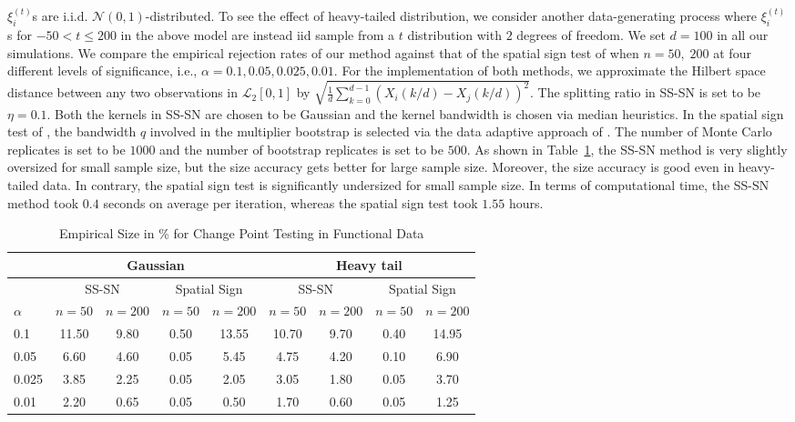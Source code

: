 \documentclass[11pt]{article}
\theoremstyle{plain}
\theoremstyle{definition}
\theoremstyle{remark}
\begin{document}
$\xi_i^{(t)}$s are i.i.d. $\mathcal{N}(0,1)$-distributed. To see the effect of heavy-tailed distribution, we consider another data-generating process where $\xi_i^{(t)}$s for $-50<t\leq 200$ in the above model are instead iid sample from a $t$ distribution with $2$ degrees of freedom. We set $d=100$ in all our simulations.  We compare the empirical rejection rates of our method against that of the spatial sign test of \cite{wegner2024robust} when $n=50,\; 200$ at four different levels of significance, i.e., $\alpha=0.1, 0.05, 0.025, 0.01$. For the implementation of both methods, we approximate the Hilbert space distance between any two observations in $\mathcal{L}_2[0,1]$ by $\sqrt{\frac{1}{d}\sum_{k=0}^{d-1} (X_i(k/d)-X_j(k/d))^2}.$ The splitting ratio in SS-SN is set to be $\eta=0.1$. Both the kernels in SS-SN are chosen to be Gaussian and the kernel bandwidth is chosen via median heuristics. In the spatial sign test of \cite{wegner2024robust}, the bandwidth $q$ involved in the multiplier bootstrap is selected via the data adaptive approach of \cite{rice2017plug}. The number of Monte Carlo replicates is set to be $1000$ and the number of bootstrap replicates is set to be $500$. As shown in Table~\ref{tab:Size_CPD_FDA}, the SS-SN method is very slightly oversized for small sample size, but the size accuracy gets better for large sample size. Moreover, the size accuracy is good even in heavy-tailed data. In contrary, the spatial sign test is significantly undersized for small sample size. In terms of computational time, the SS-SN method took $0.4$ seconds on average per iteration, whereas the spatial sign test took $1.55$ hours.\\
\begin{table}
\centering
    \caption{Empirical Size in \% for Change Point Testing in Functional Data}
    \label{tab:Size_CPD_FDA}
    \begin{tabular}{@{}l|cccc|cccc@{}}
         \hline
     & \multicolumn{4}{c|}{Gaussian} & \multicolumn{4}{c}{Heavy tail}\\
    \hline 
    & \multicolumn{2}{c}{SS-SN} & \multicolumn{2}{c}{Spatial Sign} & \multicolumn{2}{c}{SS-SN} & \multicolumn{2}{c}{Spatial Sign}\\
    \hline
        $\alpha$ & $n=50$ & $n=200$ &  $n=50$ & $n=200$ & $n=50$ & $n=200$ & $n=50$ & $n=200$ \\
        \hline
      0.1 & 11.50 & 9.80 & 0.50 & 13.55 & 10.70 & 9.70 & 0.40 & 14.95 \\ 
  0.05 & 6.60 & 4.60 & 0.05 & 5.45 & 4.75 & 4.20 & 0.10 & 6.90 \\ 
  0.025 & 3.85 & 2.25 & 0.05 & 2.05 & 3.05 & 1.80 & 0.05 & 3.70 \\ 
  0.01 & 2.20 & 0.65 & 0.05 & 0.50 & 1.70 & 0.60 & 0.05 & 1.25 \\ 
        \hline
    \end{tabular}
\end{table}
\end{document}
